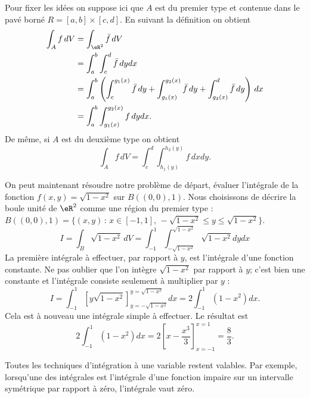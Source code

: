 Pour fixer les idées on suppose ici que \( A\) est du premier type et contenue dans le pavé borné \( R=[a,b]\times [c,d]\). En suivant la définition on obtient
\begin{equation}
	\begin{aligned}
		\int_A f\, dV & =\int_{\eR^2} \bar f\, dV                                                                                              \\
		              & = \int_a^b\int_c^d \bar f\, dy dx                                                                                      \\
		              & = \int_a^b\left(\int_c^{g_1(x)} \bar f\, dy+\int_{g_1(x)}^{g_2(x)} \bar f\, dy+\int_{g_2(x)}^d \bar f\, dy\right)\, dx \\
		              & = \int_a^b\int_{g_1(x)}^{g_2(x)}  f\, dy dx.
	\end{aligned}
\end{equation}
De même, si \( A\) est du deuxième type on obtient
\begin{equation}
	\int_A f\, dV=\int_c^d\int_{h_1(y)}^{h_2(y)}  f\, dx dy.
\end{equation}
\begin{example}
	On peut maintenant résoudre notre problème de départ, évaluer l'intégrale de la fonction \( f(x,y)=\sqrt{1-x^2}\) sur \( B((0,0),1)\). Nous choisissons de décrire la boule unité de \( \eR^2\) comme une région du premier type : \( B((0,0),1)=\{(x,y)\, :\, x\in[-1,1], \, -\sqrt{1-x^2}\leq y\leq \sqrt{1-x^2} \}\).
	\begin{equation}
		I=\int_{B}\sqrt{1-x^2}\, dV=\int_{-1}^1\int_{-\sqrt{1-x^2}}^{\sqrt{1-x^2}}\sqrt{1-x^2}dydx
	\end{equation}
	La première intégrale à effectuer, par rapport à \( y\), est l'intégrale d'une fonction constante. Ne pas oublier que l'on intègre \( \sqrt{1-x^2}\) par rapport à \( y\); c'est bien une constante et l'intégrale consiste seulement à multiplier par \( y\) :
	\begin{equation}
		I=\int_{-1}^1\left[ y\sqrt{1-x^2} \right]_{y=-\sqrt{1-x^2}}^{y=\sqrt{1-x^2}}dx=2\int_{-1}^1(1-x^2)dx.
	\end{equation}
	Cela est à nouveau une intégrale simple à effectuer. Le résultat est
	\begin{equation}
		2\int_{-1}^1(1-x^2)dx=2\left[ x-\frac{ x^3 }{ 3 } \right]_{x=-1}^{x=1}=\frac{ 8 }{ 3 }.
	\end{equation}
\end{example}
\begin{remark}
	Toutes les techniques d'intégration à une variable restent valables. Par exemple, lorsqu'une des intégrales est l'intégrale d'une fonction impaire sur un intervalle symétrique par rapport à zéro, l'intégrale vaut zéro.
\end{remark}

